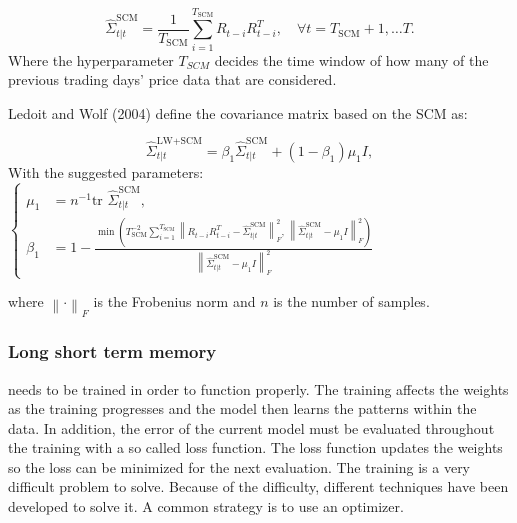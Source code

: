 \documentclass[final]{LTHtwocol} %
\begin{document}
\begin{equation}
    \label{eq:SCM}
\hat \Sigma_{t|t}^{\text{SCM}} = \frac{1}{T_{\text{SCM}}} \sum_{i = 1}^{T_{\text{SCM}}} R_{t-i}R_{t-i}^{T}, \quad \forall t = T_{\text{SCM}} + 1,\ldots T.
\end{equation}
Where the hyperparameter $T_{SCM}$  decides the time window of how many of the previous trading days' price data that are considered.

Ledoit and Wolf (2004) define the covariance matrix based on the SCM as:

\begin{equation}
    \hat\Sigma_{t|t}^{\text{LW+SCM}} = \beta_{1} \hat\Sigma_{t|t}^{\text{SCM}} + (1-\beta_{1}) \mu_{1} I,
\end{equation}
With the suggested parameters:\\

    $\begin{cases}
    \mu_{1} &= n^{-1}\text{tr }\hat\Sigma_{t|t}^{\text{SCM}}, \\ 
    \beta_{1} &= 1 - \frac{\min\left(T_{\text{SCM}}^{-2}\sum_{i=1}^{T_{\text{SCM}}}\left\lVert R_{t-i}R_{t-i}^{T} - \hat\Sigma_{t|t}^{\text{SCM}}\right\rVert_{F}^{2},\,\left\lVert\hat\Sigma_{t|t}^{\text{SCM}}-\mu_{1} I\right\rVert_{F}^{2}\right)}{\left\lVert\hat\Sigma_{t|t}^{\text{SCM}}-\mu_{1} I\right\rVert_{F}^{2}}
    \end{cases}$


where $\left\lVert\cdot\right\rVert_{F}$ is the Frobenius norm and $n$ is the number of samples.\\

\subsubsection{Long short term memory}
needs to be trained in order to function properly. The training affects the weights as the training progresses and the model then learns the patterns within the data. In addition, the error of the current model must be evaluated throughout the training with a so called loss function. The loss function updates the weights so the loss can be minimized for the next evaluation. \cite{uppsala} The training is a very difficult problem to solve. Because of the difficulty, different techniques have been developed to solve it. A common strategy is to use an optimizer. \cite{Goodfellow-et-al-2016}
\end{document}
